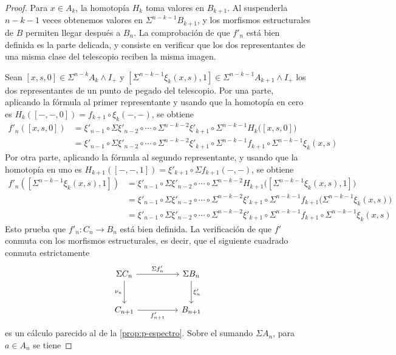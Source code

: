 \begin{proof}
Para $x\in A_k$, la homotopía $H_k$ toma valores en $B_{k+1}$. Al suspenderla $n-k-1$ veces obtenemos valores en $\Sigma^{n-k-1}B_{k+1}$, y los morfismos estructurales de $B$ permiten llegar después a $B_n$. La comprobación de que $f'_n$ está bien definida es la parte delicada, y consiste en verificar que los dos representantes de una misma clase del telescopio reciben la misma imagen.

Sean $[x,s,0]\in\Sigma^{n-k}A_k \wedge I_+$ y $[\Sigma^{n-k-1}\xi_k(x,s),1]\in\Sigma^{n-k-1}A_{k+1} \wedge I_+$ los dos representantes de un punto de pegado del telescopio. Por una parte, aplicando la fórmula al primer representante y usando que la homotopía en cero es $H_{k}([-,-,0])=f_{k+1}\circ\xi_{k}(-,-)$, se obtiene
\begin{align*}
f'_n([x,s,0])
&= \xi'_{n-1}\circ\Sigma\xi'_{n-2}\circ\cdots\circ\Sigma^{n-k-2}\xi'_{k+1}\circ\Sigma^{n-k-1}H_{k}\bigl([x,s,0]\bigr)\\
&= \xi'_{n-1}\circ\Sigma\xi'_{n-2}\circ\cdots\circ\Sigma^{n-k-2}\xi'_{k+1}\circ\Sigma^{n-k-1}f_{k+1}\circ\Sigma^{n-k-1}\xi_{k}(x,s)
\end{align*}
Por otra parte, aplicando la fórmula al segundo representante, y usando que la homotopía en uno es $H_{k+1}([-,-,1])=\xi'_{k+1}\circ\Sigma f_{k+1}(-,-)$, se obtiene
\begin{align*}
f'_n([\Sigma^{n-k-1}\xi_k(x,s),1])
&= \xi'_{n-1}\circ\Sigma\xi'_{n-2}\circ\cdots\circ\Sigma^{n-k-2}H_{k+1}\bigl([\Sigma^{n-k-1}\xi_k(x,s),1]\bigr)\\
&= \xi'_{n-1}\circ\Sigma\xi'_{n-2}\circ\cdots\circ\Sigma^{n-k-2}\xi'_{k+1}\circ\Sigma^{n-k-1} f_{k+1}\bigl(\Sigma^{n-k-1}\xi_k(x,s)\bigr)\\
&= \xi'_{n-1}\circ\Sigma\xi'_{n-2}\circ\cdots\circ\Sigma^{n-k-2}\xi'_{k+1}\circ\Sigma^{n-k-1}f_{k+1}\circ\Sigma^{n-k-1}\xi_{k}(x,s)
\end{align*}
Esto prueba que $f'_n \colon C_n \to B_n$ está bien definida.
La verificación de que $f'$ conmuta con los morfismos estructurales, es decir, que el siguiente cuadrado conmuta estrictamente
\[
\begin{tikzcd}[column sep=huge, row sep=large]
\Sigma C_n \arrow[r,"\Sigma f'_n"] \arrow[d,"\nu_n"'] & \Sigma B_n \arrow[d,"\xi'_n"]\\
C_{n+1} \arrow[r,"f'_{n+1}"'] & B_{n+1}
\end{tikzcd}
\]
es un cálculo parecido al de la \cref{prop:p-espectro}. Sobre el sumando $\Sigma A_n$, para $a\in A_n$ se tiene

\end{proof}
